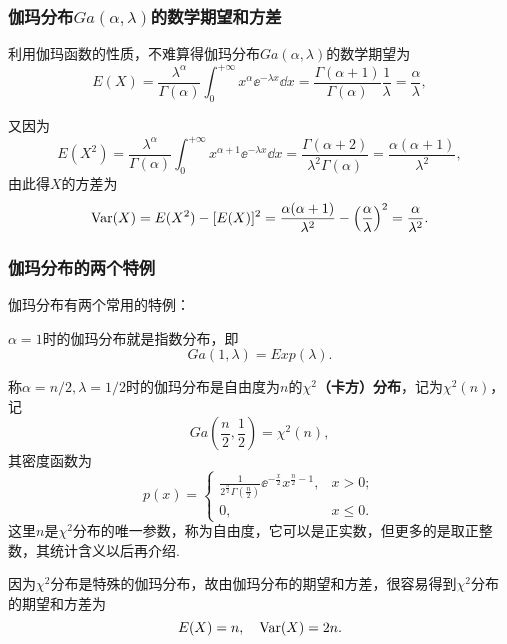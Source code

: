 \subsubsection{伽玛分布$Ga(\alpha,\lambda)$的数学期望和方差}
利用伽玛函数的性质，不难算得伽玛分布$Ga(\alpha,\lambda)$的数学期望为
\[
  E(X) = \frac{\lambda^\alpha}{\Gamma(\alpha)} \int_0^{+\infty}x^\alpha \ee^{-\lambda x}\dd x
  = \frac{\Gamma(\alpha+1)}{\Gamma(\alpha)} \frac1\lambda = \frac\alpha\lambda,
\]

又因为
\[
  E(X^2) = \frac{\lambda^\alpha}{\Gamma(\alpha)}
  \int_0^{+\infty} x^{\alpha+1}\ee^{-\lambda x}\dd x = \frac{\Gamma(\alpha+2)}{\lambda^2\Gamma(\alpha)}
  = \frac{\alpha(\alpha+1)}{\lambda^2},
\]
由此得$X$的方差为
\[
  \Var(X) = E(X^2) - [E(X)]^2 = \frac{\alpha(\alpha+1)}{\lambda^2} - \left(\frac\alpha\lambda\right)^2 = \frac\alpha{\lambda^2}.
\]

\subsubsection{伽玛分布的两个特例}
伽玛分布有两个常用的特例：

\begin{inparaenum}
  \item $\alpha=1$时的伽玛分布就是指数分布，即
  \begin{equation}\label{eq2.5.13}
    Ga(1,\lambda) = Exp(\lambda).
  \end{equation}

  \item 称$\alpha=n/2,\lambda=1/2$时的伽玛分布是自由度为$n$的\textbf{$\chi^2$（卡方）分布}，记为$\chi^2(n)$，记
      \begin{equation}\label{eq2.5.14}
        Ga\left( \frac n2, \frac12 \right) = \chi^2(n),
      \end{equation}
      其密度函数为
      \begin{equation}\label{eq2.5.15}
        p(x) = \begin{cases}
          \frac1{2^{\frac n2}\Gamma\left(\frac n2\right)} \ee^{-\frac x2}x^{\frac n2-1}, & x > 0 ; \\
          0, & x \le 0.
        \end{cases}
      \end{equation}
      这里$n$是$\chi^2$分布的唯一参数，称为自由度，它可以是正实数，但更多的是取正整数，其统计含义以后再介绍.

      因为$\chi^2$分布是特殊的伽玛分布，故由伽玛分布的期望和方差，很容易得到$\chi^2$分布的期望和方差为
      \[
        E(X) = n,\quad \operatorname{Var}(X) = 2n.
      \]
\end{inparaenum}

